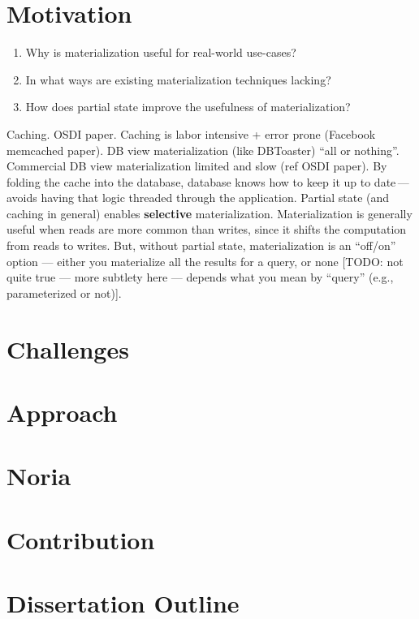 \section{Motivation}

\begin{enumerate}
 \item Why is materialization useful for real-world use-cases?
 \item In what ways are existing materialization techniques lacking?
 \item How does partial state improve the usefulness of materialization?
\end{enumerate}

Caching.
OSDI paper.
Caching is labor intensive + error prone (Facebook memcached paper).
DB view materialization (like DBToaster) ``all or nothing''.
Commercial DB view materialization limited and slow (ref OSDI paper).
By folding the cache into the database, database knows how to keep it up
to date\,---\,avoids having that logic threaded through the application.
Partial state (and caching in general) enables \textbf{selective} materialization.
Materialization is generally useful when reads are more common than
writes, since it shifts the computation from reads to writes.
But, without partial state, materialization is an ``off/on'' option —
either you materialize all the results for a query, or none [TODO: not
quite true — more subtlety here — depends what you mean by ``query''
(e.g., parameterized or not)].

\section{Challenges}
\section{Approach}
\section{Noria}
\section{Contribution}
\section{Dissertation Outline}
